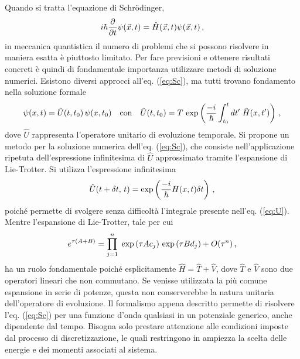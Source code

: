 \documentclass{article}
\begin{document}
Quando si tratta l'equazione di Schr\"odinger, 
\begin{equation}
    \centering
    i \hbar \frac{\partial}{\partial t} \psi (\vec{x}, t) = \hat{H} (\vec{x}, t) \psi (\vec{x}, t) \, \text{,}
    \label{eq:Sc}
\end{equation}
in meccanica quantistica il numero di problemi che si possono risolvere in maniera esatta è piuttosto limitato. Per fare previsioni e ottenere risultati concreti è quindi di fondamentale importanza utilizzare metodi di soluzione numerici.
Esistono diversi approcci all'eq. (\ref{eq:Sc}), ma tutti trovano fondamento nella soluzione formale 
\begin{equation}
    \centering
    \psi (x,t) = \hat{U}(t, t_{0}) \, \psi (x, t_0) \quad \text{con}  \quad \hat{U}(t, t_{0}) = T  \, \exp \left(\frac{-i}{\hbar} \int _{t_{0}} ^{t} dt' \; \hat{H}(x,t') \right) \, \text{,}
    \label{eq:U}
\end{equation}
dove $\hat{U}$ rappresenta l'operatore unitario di evoluzione temporale.
Si propone un metodo per la soluzione numerica dell'eq. (\ref{eq:Sc}), che consiste nell'applicazione ripetuta dell'espressione infinitesima di $\hat{U}$ approssimato tramite l'espansione di  Lie-Trotter.
Si utilizza l'espressione infinitesima
\begin{equation}
    \centering
    \hat{U}(t + \delta t, \, t) = \exp \left(\frac{-i}{\hbar} {H}(x,t) \delta t \right) \, \text{,}
    \label{eq:U_inf}
\end{equation}
poiché permette di svolgere senza difficoltà l'integrale presente nell'eq. (\ref{eq:U}).
Mentre l'espansione di Lie-Trotter, tale per cui
\begin{equation}
    \centering
    e^{\tau ({A} + {B})}
    = \prod _{j=1} ^{n} \; \exp \left( \tau A c_{j}\right)  \, \exp \left(\tau B d_{j}\right) + O(\tau^{n}) \, \text{,}
    \label{eq:LT_expantion}
\end{equation}
ha un ruolo fondamentale poiché esplicitamente $\hat{H} = \hat{T} + \hat{V}$, dove $\hat{T}$ e $\hat{V}$ sono due operatori lineari che non commutano. Se venisse utilizzata la più comune espansione in serie di potenze, questa non conserverebbe la natura unitaria dell'operatore di evoluzione.
Il formalismo appena descritto permette di risolvere l'eq. (\ref{eq:Sc}) per una funzione d'onda qualsiasi in un potenziale generico, anche dipendente dal tempo. Bisogna solo prestare attenzione alle condizioni imposte dal processo di discretizzazione, le quali restringono in ampiezza la scelta delle energie e dei momenti associati al sistema.
\end{document}
